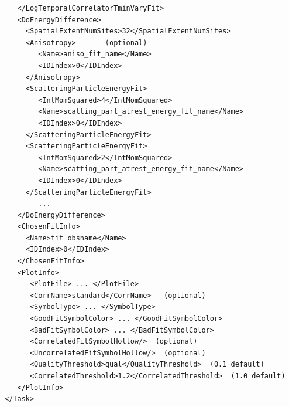\documentclass[12pt]{article}
\begin{document}
\begin{verbatim}
   </LogTemporalCorrelatorTminVaryFit>                                   
   <DoEnergyDifference>                                                  
     <SpatialExtentNumSites>32</SpatialExtentNumSites>                   
     <Anisotropy>       (optional)                                       
        <Name>aniso_fit_name</Name>                                      
        <IDIndex>0</IDIndex>                                             
     </Anisotropy>                                                       
     <ScatteringParticleEnergyFit>                                       
        <IntMomSquared>4</IntMomSquared>                                 
        <Name>scatting_part_atrest_energy_fit_name</Name>                
        <IDIndex>0</IDIndex>                                             
     </ScatteringParticleEnergyFit>                                      
     <ScatteringParticleEnergyFit>                                       
        <IntMomSquared>2</IntMomSquared>                                 
        <Name>scatting_part_atrest_energy_fit_name</Name>                
        <IDIndex>0</IDIndex>                                             
     </ScatteringParticleEnergyFit>                                      
        ...                                                              
   </DoEnergyDifference>                                                 
   <ChosenFitInfo>                                                       
     <Name>fit_obsname</Name>                                            
     <IDIndex>0</IDIndex>                                                
   </ChosenFitInfo>                                                      
   <PlotInfo>                                                            
      <PlotFile> ... </PlotFile>                                         
      <CorrName>standard</CorrName>   (optional)                         
      <SymbolType> ... </SymbolType>                                     
      <GoodFitSymbolColor> ... </GoodFitSymbolColor>                     
      <BadFitSymbolColor> ... </BadFitSymbolColor>                       
      <CorrelatedFitSymbolHollow/>  (optional)                           
      <UncorrelatedFitSymbolHollow/>  (optional)                         
      <QualityThreshold>qual</QualityThreshold>  (0.1 default)           
      <CorrelatedThreshold>1.2</CorrelatedThreshold>  (1.0 default)      
   </PlotInfo>                                                           
</Task>                                                                  
\end{verbatim}
\end{document}

